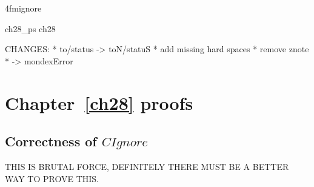 \ai4fmignore{
\begin{zsection}
  \SECTION ch28\_ps \parents ch28
\end{zsection}
CHANGES:
* to/status -> toN/statuS
* add missing hard spaces
* remove znote
* \bot -> mondexError
}
\chapter{Chapter~\ref{ch28} proofs}

\section{Correctness of $CIgnore$}

THIS IS BRUTAL FORCE, DEFINITELY THERE MUST BE A BETTER WAY TO PROVE THIS.

